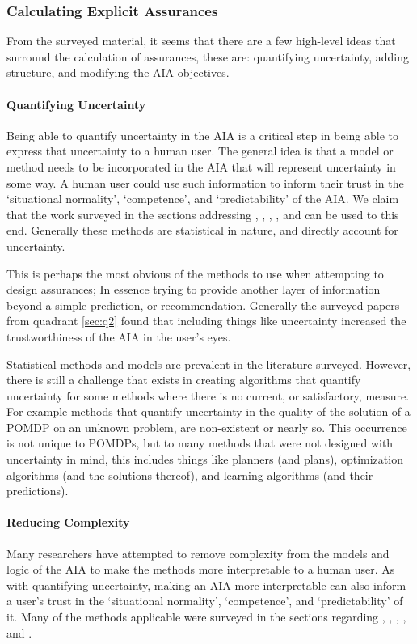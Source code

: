    \subsubsection{Calculating Explicit Assurances}
    From the surveyed material, it seems that there are a few high-level ideas that surround the calculation of assurances, these are: quantifying uncertainty, adding structure, and modifying the AIA objectives.

    \paragraph{Quantifying Uncertainty} Being able to quantify uncertainty in the AIA is a critical step in being able to express that uncertainty to a human user. The general idea is that a model or method needs to be incorporated in the AIA that will represent uncertainty in some way. A human user could use such information to inform their trust in the `situational normality', `competence', and `predictability' of the AIA. We claim that the work surveyed in the sections addressing , , , , and  can be used to this end. Generally these methods are statistical in nature, and directly account for uncertainty.

    This is perhaps the most obvious of the methods to use when attempting to design assurances; In essence trying to provide another layer of information beyond a simple prediction, or recommendation. Generally the surveyed papers from quadrant \ref{sec:q2} found that including things like uncertainty increased the trustworthiness of the AIA in the user's eyes.

    Statistical methods and models are prevalent in the literature surveyed. However, there is still a challenge that exists in creating algorithms that quantify uncertainty for some methods where there is no current, or satisfactory, measure. For example methods that quantify uncertainty in the quality of the solution of a POMDP on an unknown problem, are non-existent or nearly so. This occurrence is not unique to POMDPs, but to many methods that were not designed with uncertainty in mind, this includes things like planners (and plans), optimization algorithms (and the solutions thereof), and learning algorithms (and their predictions).

    \paragraph{Reducing Complexity} Many researchers have attempted to remove complexity from the models and logic of the AIA to make the methods more interpretable to a human user. As with quantifying uncertainty, making an AIA more interpretable can also inform a user's trust in the `situational normality', `competence', and `predictability' of it. Many of the methods applicable were surveyed in the sections regarding , , , ,  and .

